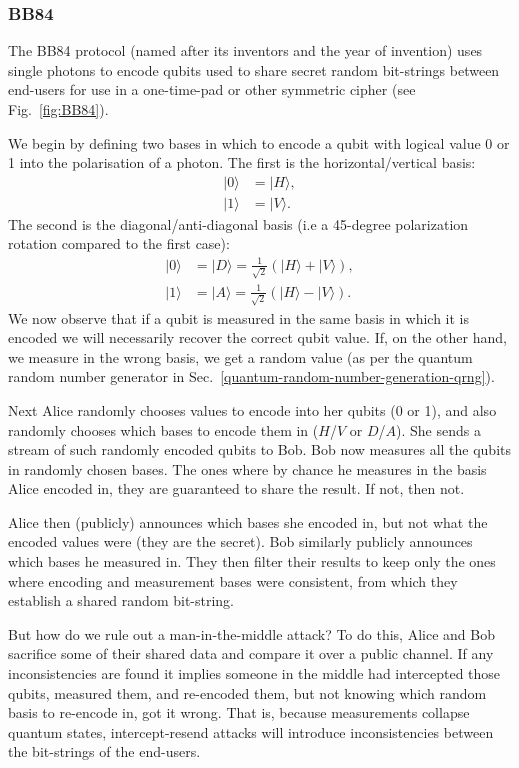 \subsubsection{BB84} \label{bb84}

The BB84 protocol (named after its inventors and the year of invention) \cite{bib:bb84} uses single photons to encode qubits used to share secret random bit-strings between end-users for use in a one-time-pad or other symmetric cipher (see Fig.~\ref{fig:BB84}).

We begin by defining two bases in which to encode a qubit with logical value 0 or 1 into the polarisation of a photon. The first is the horizontal/vertical basis:
\begin{align}
	|0\rangle &= |H\rangle,\nonumber\\
	|1\rangle &= |V\rangle.
\end{align}
The second is the diagonal/anti-diagonal basis (i.e a 45-degree polarization rotation compared to the first case): 
\begin{align}
	|0\rangle &= |D\rangle = \frac{1}{\sqrt{2}}(|H\rangle+|V\rangle),\nonumber\\
	|1\rangle &= |A\rangle = \frac{1}{\sqrt{2}}(|H\rangle-|V\rangle).
\end{align}
We now observe that if a qubit is measured in the same basis in which it is encoded we will necessarily recover the correct qubit value. If, on the other hand, we measure in the wrong basis, we get a random value (as per the quantum random number generator in Sec.~\ref{quantum-random-number-generation-qrng}).

Next Alice randomly chooses values to encode into her qubits (0 or 1), and also randomly chooses which bases to encode them in ($H$/$V$ or $D$/$A$). She sends a stream of such randomly encoded qubits to Bob. Bob now measures all the qubits in randomly chosen bases. The ones where by chance he measures in the basis Alice encoded in, they are guaranteed to share the result. If not, then not.

Alice then (publicly) announces which bases she encoded in, but not what the encoded values were (they are the secret). Bob similarly publicly announces which bases he measured in. They then filter their results to keep only the ones where encoding and measurement bases were consistent, from which they establish a shared random bit-string.

But how do we rule out a man-in-the-middle attack? To do this, Alice and Bob sacrifice some of their shared data and compare it over a public channel. If any inconsistencies are found it implies someone in the middle had intercepted those qubits, measured them, and re-encoded them, but not knowing which random basis to re-encode in, got it wrong. That is, because measurements collapse quantum states, intercept-resend attacks will introduce inconsistencies between the bit-strings of the end-users.

